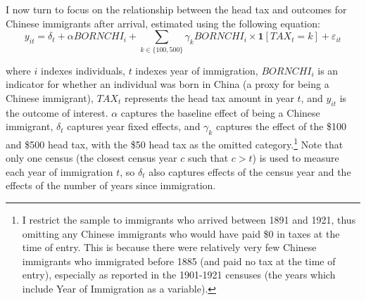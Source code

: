 \documentclass[12pt]{article}
\begin{document}
\begin{table}[!h]
    \centering 
    \renewcommand{\arraystretch}{1.5}
\end{table}

I now turn to focus on the relationship between the head tax and outcomes for Chinese immigrants after arrival, estimated using the following equation: 
\begin{equation}
    \label{eq:did}
    y_{it} = \delta_t + \alpha BORNCHI_i + \sum_{k \in \{100, 500\}} \gamma_k BORNCHI_i \times \mathbf{1}[TAX_t = k] + \varepsilon_{it}
\end{equation}

where $i$ indexes individuals, $t$ indexes year of immigration, $BORNCHI_i$ is an indicator for whether an individual was born in China (a proxy for being a Chinese immigrant), $TAX_t$ represents the head tax amount in year $t$, and $y_{it}$ is the outcome of interest. $\alpha$ captures the baseline effect of being a Chinese immigrant, $\delta_t$ captures year fixed effects, and $\gamma_k$ captures the effect of the \$100 and \$500 head tax, with the \$50 head tax as the omitted category.\footnote{I restrict the sample to immigrants who arrived between 1891 and 1921, thus omitting any Chinese immigrants who would have paid \$0 in taxes at the time of entry. This is because there were relatively very few Chinese immigrants who immigrated before 1885 (and paid no tax at the time of entry), especially as reported in the 1901-1921 censuses (the years which include Year of Immigration as a variable).} 
Note that only one census (the closest census year $c$ such that $c > t$) is used to measure each year of immigration $t$, so $\delta_t$ also captures effects of the census year and the effects of the number of years since immigration. 
\end{document}
